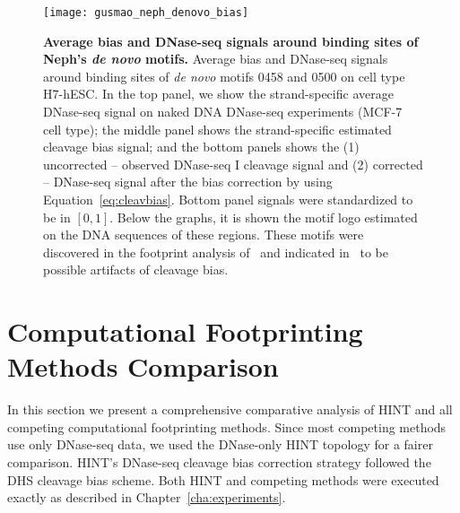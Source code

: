\begin{figure}[h!]
\centering
\texttt{[image: gusmao\_neph\_denovo\_bias]}
\caption[Average bias and DNase-seq signals around binding sites of Neph's \emph{de novo} motifs]{\textbf{Average bias and DNase-seq signals around binding sites of Neph's \emph{de novo} motifs.} Average bias and DNase-seq signals around binding sites of \emph{de novo} motifs 0458 and 0500 on cell type H7-hESC. In the top panel, we show the strand-specific average DNase-seq signal on naked DNA DNase-seq experiments (MCF-7 cell type); the middle panel shows the strand-specific estimated cleavage bias signal; and the bottom panels shows the (1) uncorrected -- observed DNase-seq I cleavage signal and (2) corrected -- DNase-seq signal after the bias correction by using Equation~\ref{eq:cleavbias}. Bottom panel signals were standardized to be in $[0,1]$. Below the graphs, it is shown the motif logo estimated on the DNA sequences of these regions. These motifs were discovered in the footprint analysis of~\cite{neph2012a} and indicated in~\cite{he2014} to be possible artifacts of cleavage bias.}
\label{fig:gusmao_neph_denovo_bias}
\end{figure}





























\section{Computational Footprinting Methods Comparison}
\label{sec:computational.footprinting.methods.comparison}

In this section we present a comprehensive comparative analysis of HINT and all competing computational footprinting methods. Since most competing methods use only DNase-seq data, we used the DNase-only HINT topology for a fairer comparison. HINT's DNase-seq cleavage bias correction strategy followed the DHS cleavage bias scheme. Both HINT and competing methods were executed exactly as described in Chapter~\ref{cha:experiments}.

